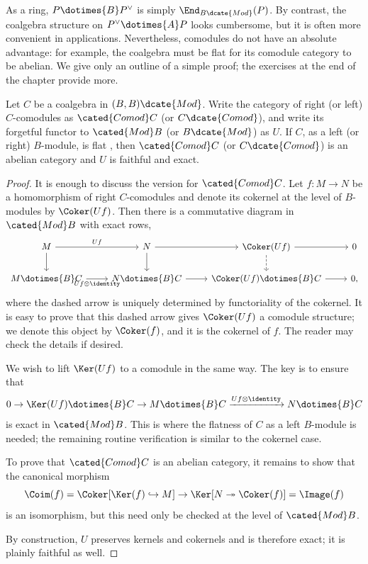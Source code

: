 As a ring, $P\dotimes{B}P^\vee$ is simply
$\End_{B\dcate{Mod}}(P)$. By contrast, the coalgebra structure on
$P^\vee\dotimes{A}P$ looks cumbersome, but it is often more convenient in
applications. Nevertheless, comodules do not have an absolute advantage:
for example, the coalgebra must be flat for its comodule category to be
abelian. We give only an outline of a simple proof; the exercises at the end
of the chapter provide more.

\begin{proposition}\label{prop:Comod-abelian}
	Let $C$ be a coalgebra in $(B,B)\dcate{Mod}$. Write the category of right
	(or left) $C$-comodules as $\cated{Comod}C$ (or $C\dcate{Comod}$), and
	write its forgetful functor to $\cated{Mod}B$ (or $B\dcate{Mod}$) as
	$U$. If $C$, as a left (or right) $B$-module, is flat
	\cite[Definition 6.9.4]{Li1}, then $\cated{Comod}C$ (or
	$C\dcate{Comod}$) is an abelian category and $U$ is faithful and exact.
\end{proposition}
\begin{proof}
	It is enough to discuss the version for $\cated{Comod}C$. Let
	$f:M\to N$ be a homomorphism of right $C$-comodules and denote its
	cokernel at the level of $B$-modules by $\Coker(Uf)$. Then there is a
	commutative diagram in $\cated{Mod}B$ with exact rows,
	\[\begin{tikzcd}
		M \arrow[r, "Uf"] \arrow[d] & N \arrow[d] \arrow[r] & \Coker(Uf) \arrow[dashed, d] \arrow[r] & 0 \\
		M \dotimes{B} C \arrow[r, "{Uf \otimes \identity}"'] & N \dotimes{B} C \arrow[r] & \Coker(Uf) \dotimes{B} C \arrow[r] & 0,
	\end{tikzcd}\]
	where the dashed arrow is uniquely determined by functoriality of the
	cokernel. It is easy to prove that this dashed arrow gives $\Coker(Uf)$ a
	comodule structure; we denote this object by $\Coker(f)$, and it is the
	cokernel of $f$. The reader may check the details if desired.

	We wish to lift $\Ker(Uf)$ to a comodule in the same way. The key is to
	ensure that
	\[ 0 \to \Ker(Uf) \dotimes{B} C \to M \dotimes{B} C \xrightarrow{Uf \otimes \identity} N \dotimes{B} C \]
	is exact in $\cated{Mod}B$. This is where the flatness of $C$ as a left
	$B$-module is needed; the remaining routine verification is similar to
	the cokernel case.

	To prove that $\cated{Comod}C$ is an abelian category, it remains to show
	that the canonical morphism
	\[ \Coim(f) = \Coker[\Ker(f) \hookrightarrow M] \to \Ker[N \twoheadrightarrow \Coker(f)] = \Image(f) \]
	is an isomorphism, but this need only be checked at the level of
	$\cated{Mod}B$.

	By construction, $U$ preserves kernels and cokernels and is therefore
	exact; it is plainly faithful as well.
\end{proof}

